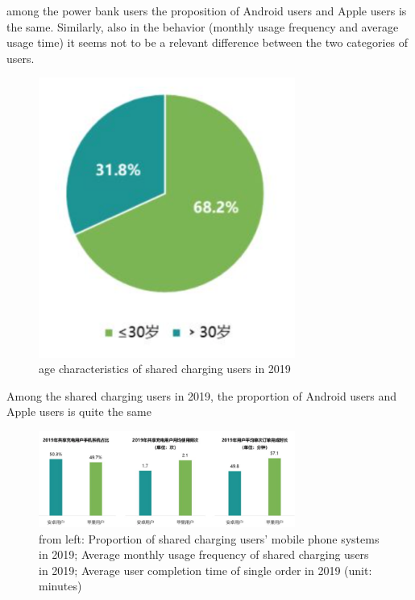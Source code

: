 \documentclass[12pt]{article}
\begin{document}
            among the power bank users the proposition of Android users and Apple users is the same. 
            Similarly, also in the behavior (monthly usage frequency and average usage time) 
            it seems not to be a relevant difference between the two categories of users. 
            \begin{figure}[h]
                \centering
                \includegraphics[width=0.75\textwidth]{china_pie_chart_ages}
                \caption{age characteristics of shared charging users in 2019}
            \end{figure}
            Among the shared charging users in 2019, the proportion of Android users and Apple users is quite the same
            \begin{figure}[h]
                \centering
                \includegraphics[width=0.75\textwidth]{china_usage_chart}
                \caption{from left: Proportion of shared charging users' mobile phone systems in 2019; 
                Average monthly usage frequency of shared charging users in 2019; 
                Average user completion time of single order in 2019 (unit: minutes)}
            \end{figure}
\end{document}
